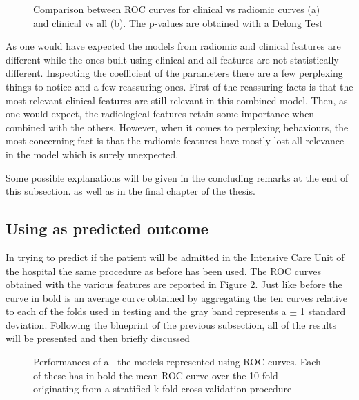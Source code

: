\begin{figure}[H]
\centering
        \caption{Comparison between ROC curves for clinical vs radiomic curves (a) and clinical vs all (b). The p-values are obtained with a Delong Test }\label{fig:delongDeath}
\end{figure}

As one would have expected the models from radiomic and clinical features are different while the ones built using clinical and all features are not statistically different.
Inspecting the coefficient of the parameters there are a few perplexing things to notice and a few reassuring ones. First of the reassuring facts is that the most relevant clinical features are still relevant in this combined model. 
Then, as one would expect, the radiological features retain some importance when combined with the others. However, when it comes to perplexing behaviours, the most concerning fact is that the radiomic features have mostly lost all relevance in the model which is surely unexpected.

Some possible explanations will be given in the concluding remarks at the end of this  subsection. as well as in the final chapter of the thesis.

\subsection{Using \icu as predicted outcome}

In trying to predict if the patient will be admitted in the Intensive Care Unit of the hospital the same procedure as before has been used. The ROC curves obtained with the various features are reported in Figure \ref{fig:ICULasso}. Just like before the curve in bold is an average curve obtained by aggregating the ten curves relative to each of the folds used in testing and the gray band represents a $\pm$ 1 standard deviation.
Following the blueprint of the previous subsection, all of the results will be presented and then briefly discussed


\begin{figure}[H]
\centering
	\newline
        \caption{Performances of all the models represented using ROC curves. Each of these has in bold the mean ROC curve over the 10-fold originating from a stratified k-fold cross-validation procedure}\label{fig:ICULasso}
\end{figure}


